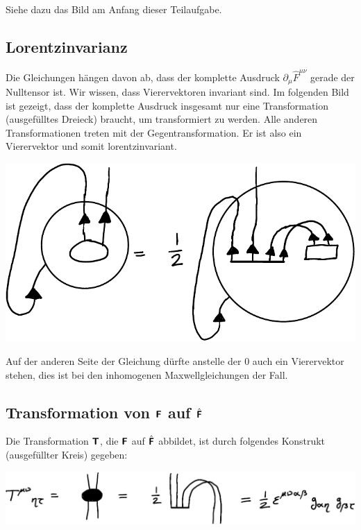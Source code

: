 Siehe dazu das Bild am Anfang dieser Teilaufgabe.

\subsection{Lorentzinvarianz}

Die Gleichungen hängen davon ab, dass der komplette Ausdruck $\partial_\mu \hat
F^{\mu\nu}$ gerade der Nulltensor ist. Wir wissen, dass Vierervektoren
invariant sind. Im folgenden Bild ist gezeigt, dass der komplette Ausdruck
insgesamt nur eine Transformation (ausgefülltes Dreieck) braucht, um
transformiert zu werden. Alle anderen Transformationen treten mit der
Gegentransformation. Er ist also ein Vierervektor und somit lorentzinvariant.
\begin{center}
	\includegraphics{H1-Penrose-7-crop.pdf}
\end{center}

Auf der anderen Seite der Gleichung dürfte anstelle der 0 auch ein Vierervektor
stehen, dies ist bei den inhomogenen Maxwellgleichungen der Fall.

\subsection{Transformation von $\boldsymbol{\mathsf{F}}$ auf $\hat{\boldsymbol{\mathsf{F}}}$}

Die Transformation $\boldsymbol{\mathsf{T}}$, die $\boldsymbol{\mathsf{F}}$ auf $\hat{\boldsymbol{\mathsf{F}}}$ abbildet, ist
durch folgendes Konstrukt (ausgefüllter Kreis) gegeben:
\begin{center}
	\includegraphics{H1-Penrose-8-crop.pdf}
\end{center}

